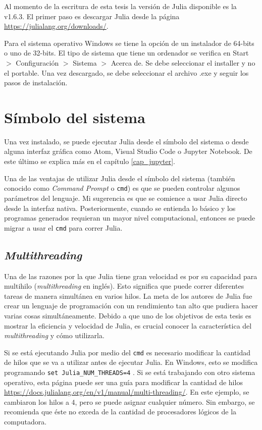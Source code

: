 Al momento de la escritura de esta tesis la versión de \textsf{Julia} disponible es la \textsf{v1.6.3}. El primer paso es descargar \textsf{Julia} desde la página \url{https://julialang.org/downloads/}. 

Para el sistema operativo \textsf{Windows} se tiene la opción de un instalador de 64-bits o uno de 32-bits. El tipo de sistema que tiene un ordenador se verifica en \textsf{Start} $>$ \textsf{Configuración} $>$ \textsf{Sistema} $>$ \textsf{Acerca de}. Se debe seleccionar el \textsf{installer} y no el \textsf{portable}. Una vez descargado, se debe seleccionar el archivo \textsf{.exe} y seguir los pasos de instalación. 

\section{Símbolo del sistema}
Una vez instalado, se puede ejecutar \textsf{Julia} desde el símbolo del sistema o desde alguna interfaz gráfica como \textsf{Atom}, \textsf{Visual Studio Code} o \textsf{Jupyter Notebook}. De este último se explica más en el capítulo \ref{cap_jupyter}. 

Una de las ventajas de utilizar \textsf{Julia} desde el símbolo del sistema (también conocido como \textit{Command Prompt} o \texttt{cmd}) es que se pueden controlar algunos parámetros del lenguaje. Mi sugerencia es que se comience a usar \textsf{Julia} directo desde la interfaz nativa. Posteriormente, cuando se entienda lo básico y los programas generados requieran un mayor nivel computacional, entonces se puede migrar a usar el \texttt{cmd} para correr \textsf{Julia}. 

\subsection{\textit{Multithreading}}
Una de las razones por la que \textsf{Julia} tiene gran velocidad es por su capacidad para multihilo (\textit{multithreading} en inglés). Esto significa que puede correr diferentes tareas de manera simultánea en varios hilos. La meta de los autores de \textsf{Julia} fue crear un lenguaje de programación con un rendimiento tan alto que pudiera hacer varias cosas simultáneamente. Debido a que uno de los objetivos de esta tesis es mostrar la eficiencia y velocidad de \textsf{Julia}, es crucial conocer la característica del \textit{multithreading} y cómo utilizarla. 

Si se está ejecutando \textsf{Julia} por medio del \texttt{cmd} es necesario modificar la cantidad de hilos que se va a utilizar antes de ejecutar \textsf{Julia}.  En \textsf{Windows}, esto se modifica programando \texttt{set Julia\_NUM\_THREADS=4} \citep{manual_Julia}. Si se está trabajando con otro sistema operativo, esta página puede ser una guía para modificar la cantidad de hilos \url{https://docs.julialang.org/en/v1/manual/multi-threading/}. En este ejemplo, se cambiaron los hilos a 4, pero se puede asignar cualquier número. Sin embargo, se recomienda que éste no exceda de la cantidad de procesadores lógicos de la computadora.  

